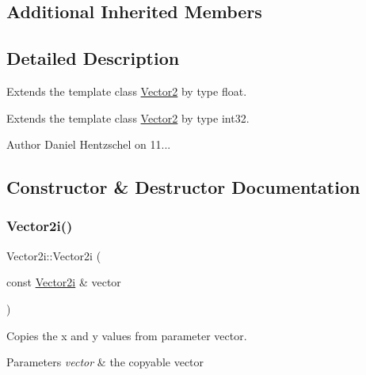 \subsection*{Additional Inherited Members}


\subsection{Detailed Description}
Extends the template class \mbox{\hyperlink{class_vector2}{Vector2}} by type float. 

Extends the template class \mbox{\hyperlink{class_vector2}{Vector2}} by type int32.

\begin{DoxyAuthor}{Author}
Daniel Hentzschel on 11... 
\end{DoxyAuthor}


\subsection{Constructor \& Destructor Documentation}
\mbox{\label{class_vector2i_adbf2fd9e34af2e90dc22339eab2c4524}} 
\subsubsection{\texorpdfstring{Vector2i()}{Vector2i()}\hspace{0.1cm}{\footnotesize\ttfamily [1/4]}}
{\footnotesize\ttfamily Vector2i\+::\+Vector2i (\begin{DoxyParamCaption}\item[{const \mbox{\hyperlink{class_vector2i}{Vector2i}} \&}]{vector }\end{DoxyParamCaption})\hspace{0.3cm}{\ttfamily [inline]}}



Copies the x and y values from parameter vector. 


\begin{DoxyParams}{Parameters}
{\em vector} & the copyable vector \\
\hline
\end{DoxyParams}
\mbox{\label{class_vector2i_ada4ad39dfa092f345d3d5de39134cf8d}} 
